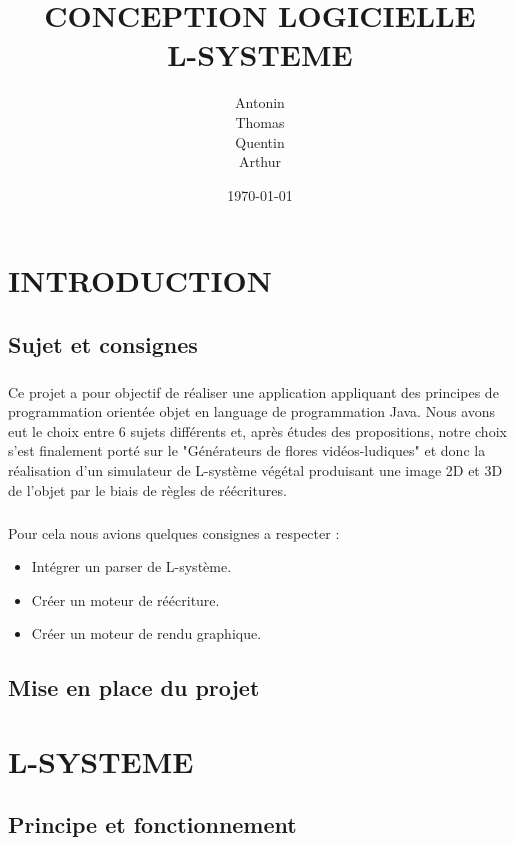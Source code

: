 \documentclass[12pt]{report}
\title{CONCEPTION LOGICIELLE\\L-SYSTEME}
\author{Antonin \bsc{Boyon}\\
Thomas \bsc{Lalong}\\ 
Quentin \bsc{Legot}\\
Arthur \bsc{Page}}
\date{\today}
\begin{document}
\maketitle
\thispagestyle{empty}
\setcounter{page}{0}

\tableofcontents
\newpage

\chapter{INTRODUCTION}
\newpage
\section{Sujet et consignes}
\paragraph{}
Ce projet a pour objectif de réaliser une application appliquant des principes de programmation orientée objet en language de programmation Java.
Nous avons eut le choix entre 6 sujets différents et, après études des propositions, notre choix s'est finalement porté sur le "Générateurs de flores vidéos-ludiques" et donc la réalisation d'un simulateur de L-système végétal produisant une image 2D et 3D de l'objet par le biais de règles de réécritures.

\paragraph{}
Pour cela nous avions quelques consignes a respecter :
\begin{itemize}
    \item Intégrer un parser de L-système.
    \item Créer un moteur de réécriture.
    \item Créer un moteur de rendu graphique.
\end{itemize}

\section{Mise en place du projet}

\chapter{L-SYSTEME}
\section{Principe et fonctionnement}
\end{document}
